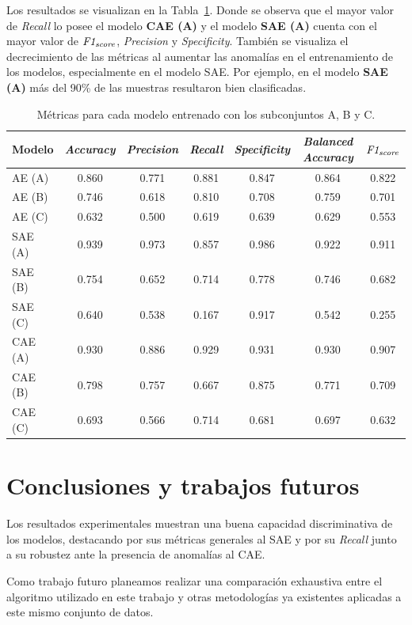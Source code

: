 \documentclass{llncs}
\begin{document}
Los resultados se visualizan en la Tabla~\ref{tab:metricas_modelos}. Donde se observa que el mayor valor de  \emph{Recall} lo posee el modelo \textbf{CAE (A)} y el modelo \textbf{SAE (A)} cuenta con el mayor valor de  $\emph{F1}_{\emph{score}}$, \emph{Precision} y \emph{Specificity}. También se visualiza el decrecimiento de las métricas al aumentar las anomalías en el entrenamiento de los modelos, especialmente en el modelo SAE. Por ejemplo, en el modelo \textbf{SAE (A)} más del 90\% de las muestras resultaron bien clasificadas.

\begin{table}%
	\centering
	\caption{Métricas para cada modelo entrenado con los subconjuntos A, B y C.}
	\begin{tabular}{lcccccc}
		\toprule
		\textbf{Modelo} &
		\textbf{\emph{Accuracy}} &
		\textbf{\emph{Precision}} &
		\textbf{\emph{Recall}} &
		\textbf{\emph{Specificity}} &
		\textbf{\emph{Balanced Accuracy}} &
		\textbf{$\emph{F1}_{\emph{score}}$} \\
		\midrule
		AE (A)  & 0.860 & 0.771 & 0.881 & 0.847 & 0.864 & 0.822 \\
		AE (B)  & 0.746 & 0.618 & 0.810 & 0.708 & 0.759 & 0.701 \\
		AE (C)  & 0.632 & 0.500 & 0.619 & 0.639 & 0.629 & 0.553 \\
		\midrule
		SAE (A) & 0.939 & 0.973 & 0.857 & 0.986 & 0.922 & 0.911 \\
		SAE (B) & 0.754 & 0.652 & 0.714 & 0.778 & 0.746 & 0.682 \\
		SAE (C) & 0.640 & 0.538 & 0.167 & 0.917 & 0.542 & 0.255 \\
		\midrule
		CAE (A) & 0.930 & 0.886 & 0.929 & 0.931 & 0.930 & 0.907 \\
		CAE (B) & 0.798 & 0.757 & 0.667 & 0.875 & 0.771 & 0.709 \\
		CAE (C) & 0.693 & 0.566 & 0.714 & 0.681 & 0.697 & 0.632 \\
		\bottomrule
	\end{tabular}
	\label{tab:metricas_modelos}
\end{table}

\section{Conclusiones y trabajos futuros}

Los resultados experimentales muestran una buena capacidad discriminativa de los modelos, destacando por sus métricas generales al SAE y por su \emph{Recall} junto a su robustez ante la presencia de anomalías al CAE. %


Como trabajo futuro planeamos realizar una comparación exhaustiva entre el algoritmo utilizado  en este trabajo y otras metodologías ya existentes aplicadas a este mismo conjunto de datos.

%
%
\begin{sloppypar}
	\printbibliography[title={Referencias}]
\end{sloppypar}
\end{document}
